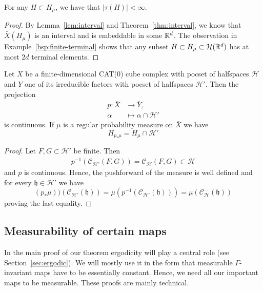 \begin{lemma}
  \label{lem:finite-terminal}
  For any \(H \subset H_\mu\), we have that \(|\tau(H)| < \infty\).
\end{lemma}

\begin{proof}
  By Lemma~\ref{lem:interval} and Theorem~\ref{thm:interval}, we know that \(\bar X(H_\mu)\) is an interval and is embeddable in some \(\mathbb{R}^d\). The observation in Example~\ref{bsp:finite-terminal} shows that any subset \(H \subset H_\mu \subset \mathcal{H}(\mathbb{R}^d)\) has at most \(2d\) terminal elements.
\end{proof}

\begin{lemma}
  \label{lem:proj-weight}
  Let \(X\) be a finite-dimensional CAT(0) cube complex with pocset of halfspaces \(\mathcal{H}\) and \(Y\) one of its irreducible factors with pocset of halfspaces \(\mathcal{H}'\). Then the projection
  \begin{align*}
    p\colon \bar X & \to \bar Y,\\
    \alpha & \mapsto \alpha \cap \mathcal{H}'
  \end{align*}
  is continuous. If \(\mu\) is a regular probability measure on \(\bar X\) we have
  \[
    H_{p_\ast \mu} = H_\mu \cap \mathcal{H}'
  \]
\end{lemma}

\begin{proof}
  Let \(F, G \subset \mathcal{H}'\) be finite. Then
  \begin{align*}
    p^{-1}(\mathcal{C_{\mathcal{H}'}}(F,G)) = \mathcal{C_{\mathcal{H}}}(F,G) \subset \mathcal{H}
  \end{align*}
  and \(p\) is continuous. Hence, the pushforward of the measure is well defined and for every \(\mathfrak{h} \in \mathcal{H}'\) we have
  \[
    (p_\ast \mu))(\mathcal{C}_{\mathcal{H}'}(\mathfrak{h})) = \mu(p^{-1}(\mathcal{C}_{\mathcal{H}'}(\mathfrak{h}))) = \mu(\mathcal{C}_{\mathcal{H}}(\mathfrak{h}))
  \]
  proving the last equality.
\end{proof}

\subsection{Measurability of certain maps}
\label{sec:meas-maps}

In the main proof of our theorem ergodicity will play a central role (see Section~\ref{sec:ergodic}). We will mostly use it in the form that measurable \(\Gamma\)-invariant maps have to be essentially constant. Hence, we need all our important maps to be measurable. These proofs are mainly technical.

